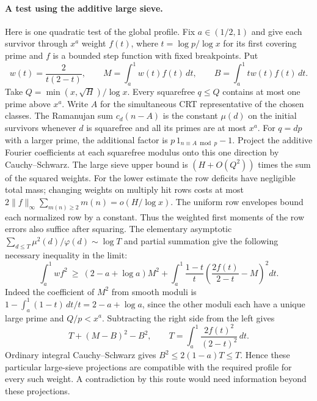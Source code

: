 \documentclass[11pt]{article}
\begin{document}
\paragraph{A test using the additive large sieve.}
Here is one quadratic test of the global profile. Fix $a\in(1/2,1)$
and give each survivor through $x^a$ weight $f(t)$, where
$t=\log p/\log x$ for its first covering prime and $f$ is a bounded
step function with fixed breakpoints. Put
\[
 w(t)=\frac2{t(2-t)},\qquad
 M=\int_a^1 w(t)f(t)\,dt,\qquad B=\int_a^1 tw(t)f(t)\,dt .
\]
Take $Q=\min(x,\sqrt H)/\log x$. Every squarefree $q\le Q$ contains
at most one prime above $x^a$. Write $A$ for the simultaneous CRT
representative of the chosen classes. The Ramanujan sum $c_d(n-A)$
is the constant $\mu(d)$ on the initial survivors whenever $d$ is
squarefree and all its primes are at most $x^a$. For $q=dp$ with a
larger prime, the additional factor is $p\,1_{n\equiv A\bmod p}-1$.
Project the additive Fourier coefficients at each squarefree modulus
onto this one direction by Cauchy--Schwarz. The large sieve upper
bound is $(H+O(Q^2))$ times the sum of the squared weights.
For the lower estimate the row deficits have negligible total mass;
changing weights on multiply hit rows costs at most
$2\|f\|_\infty\sum_{m(n)\ge2}m(n)=o(H/\log x)$.
The uniform row envelopes bound each normalized row by a constant.
Thus the weighted first moments of the row errors also suffice after
squaring. The elementary asymptotic
$\sum_{d\le T}\mu^2(d)/\varphi(d)\sim\log T$ and partial summation
give the following necessary inequality in the limit:
\[
 \int_a^1 wf^2 \ \ge\
 (2-a+\log a)M^2+
 \int_a^1\frac{1-t}{t}\left(\frac{2f(t)}{2-t}-M\right)^2dt .
\]
Indeed the coefficient of $M^2$ from smooth moduli is
$1-\int_a^1(1-t)\,dt/t=2-a+\log a$, since the other moduli each
have a unique large prime and $Q/p<x^a$.
Subtracting the right side from the left gives
\[
   T+(M-B)^2-B^2,\qquad T=\int_a^1\frac{2f(t)^2}{(2-t)^2}\,dt .
\]
Ordinary integral Cauchy--Schwarz gives $B^2\le2(1-a)T\le T$.
Hence these particular large-sieve projections are compatible with
the required profile for every such weight. A contradiction by this
route would need information beyond these projections.
\end{document}
